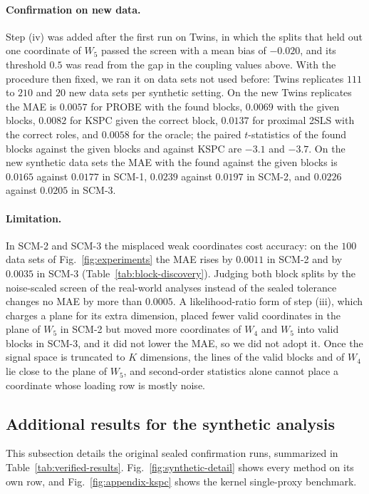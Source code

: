 \paragraph{Confirmation on new data.} Step (iv) was added after the first run on Twins, in which the splits that held out one coordinate of $W_5$ passed the screen with a mean bias of $-0.020$, and its threshold $0.5$ was read from the gap in the coupling values above. With the procedure then fixed, we ran it on data sets not used before: Twins replicates $111$ to $210$ and $20$ new data sets per synthetic setting. On the new Twins replicates the MAE is $0.0057$ for PROBE with the found blocks, $0.0069$ with the given blocks, $0.0082$ for KSPC given the correct block, $0.0137$ for proximal 2SLS with the correct roles, and $0.0058$ for the oracle; the paired $t$-statistics of the found blocks against the given blocks and against KSPC are $-3.1$ and $-3.7$. On the new synthetic data sets the MAE with the found against the given blocks is $0.0165$ against $0.0177$ in SCM-1, $0.0239$ against $0.0197$ in SCM-2, and $0.0226$ against $0.0205$ in SCM-3.

\paragraph{Limitation.} In SCM-2 and SCM-3 the misplaced weak coordinates cost accuracy: on the $100$ data sets of Fig.~\ref{fig:experiments} the MAE rises by $0.0011$ in SCM-2 and by $0.0035$ in SCM-3 (Table~\ref{tab:block-discovery}). Judging both block splits by the noise-scaled screen of the real-world analyses instead of the sealed tolerance changes no MAE by more than $0.0005$. A likelihood-ratio form of step (iii), which charges a plane for its extra dimension, placed fewer valid coordinates in the plane of $W_5$ in SCM-2 but moved more coordinates of $W_4$ and $W_5$ into valid blocks in SCM-3, and it did not lower the MAE, so we did not adopt it. Once the signal space is truncated to $K$ dimensions, the lines of the valid blocks and of $W_4$ lie close to the plane of $W_5$, and second-order statistics alone cannot place a coordinate whose loading row is mostly noise.

\subsection{Additional results for the synthetic analysis}
\label{sec:appendix-synthetic-results}

 This subsection details the original sealed confirmation runs, summarized in Table~\ref{tab:verified-results}. Fig.~\ref{fig:synthetic-detail} shows every method on its own row, and Fig.~\ref{fig:appendix-kspc} shows the kernel single-proxy benchmark.

